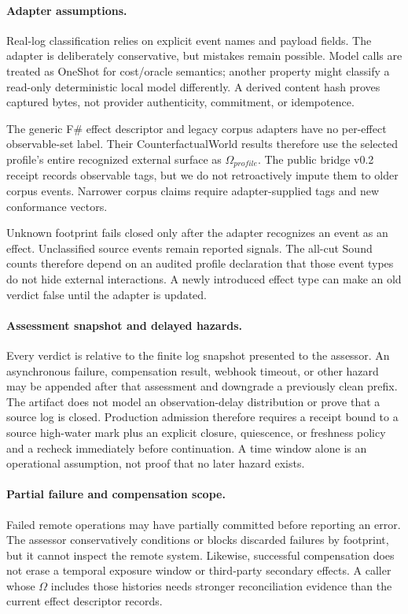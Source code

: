 \paragraph{Adapter assumptions.}
Real-log classification relies on explicit event names and payload fields.  The
adapter is deliberately conservative, but mistakes remain possible.  Model
calls are treated as OneShot for cost/oracle semantics; another property might
classify a read-only deterministic local model differently.  A derived content
hash proves captured bytes, not provider authenticity, commitment, or
idempotence.

The generic F\# effect descriptor and legacy corpus adapters have no per-effect
observable-set label.  Their CounterfactualWorld results therefore use the
selected profile's entire recognized external surface as
$\Omega_{profile}$.  The public bridge v0.2 receipt records
observable tags, but we do not retroactively impute them to older corpus events.
Narrower corpus claims require adapter-supplied tags and new conformance
vectors.

Unknown footprint fails closed only after the adapter recognizes an event as an
effect.  Unclassified source events remain reported signals.  The all-cut Sound
counts therefore depend on an audited profile declaration that those event
types do not hide external interactions.  A newly introduced effect type can
make an old verdict false until the adapter is updated.

\paragraph{Assessment snapshot and delayed hazards.}
Every verdict is relative to the finite log snapshot presented to the assessor.
An asynchronous failure, compensation result, webhook timeout, or other hazard
may be appended after that assessment and downgrade a previously clean prefix.
The artifact does not model an observation-delay distribution or prove that a
source log is closed.  Production admission therefore requires a receipt bound
to a source high-water mark plus an explicit closure, quiescence, or freshness
policy and a recheck immediately before continuation.  A time window alone is
an operational assumption, not proof that no later hazard exists.

\paragraph{Partial failure and compensation scope.}
Failed remote operations may have partially committed before reporting an
error.  The assessor conservatively conditions or blocks discarded failures by
footprint, but it cannot inspect the remote system.  Likewise, successful
compensation does not erase a temporal exposure window or third-party secondary
effects.  A caller whose $\Omega$ includes those histories needs stronger
reconciliation evidence than the current effect descriptor records.

